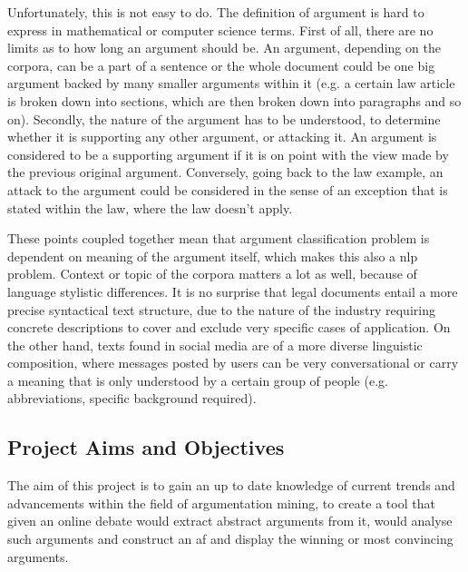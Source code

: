  Unfortunately, this is not easy to do. The definition of argument is hard to express in mathematical or computer science terms. First of all, there are no limits as to how long an argument should be. An argument, depending on the corpora, can be a part of a sentence or the whole document could be one big argument backed by many smaller arguments within it (e.g. a certain law article is broken down into sections, which are then broken down into paragraphs and so on). Secondly, the nature of the argument has to be understood, to determine whether it is supporting any other argument, or attacking it. An argument is considered to be a supporting argument if it is on point with the view made by the previous original argument. Conversely, going back to the law example, an attack to the argument could be considered in the sense of an exception that is stated within the law, where the law doesn't apply. 
 
 These points coupled together mean that argument classification problem is dependent on meaning of the argument itself, which makes this also a \gls{nlp} problem. Context or topic of the corpora matters a lot as well, because of language stylistic differences. It is no surprise that legal documents entail a more precise syntactical text structure, due to the nature of the industry requiring concrete descriptions to cover and exclude very specific cases of application. On the other hand, texts found in social media are of a more diverse linguistic composition, where messages posted by users can be very conversational or carry a meaning that is only understood by a certain group of people (e.g. abbreviations, specific background required).

\subsection{Project Aims and Objectives} 
 The aim of this project is to gain an up to date knowledge of current trends and advancements within the field of argumentation mining, to create a tool that given an online debate would extract abstract arguments from it, would analyse such arguments and construct an \gls{af} and display the winning or most convincing arguments.